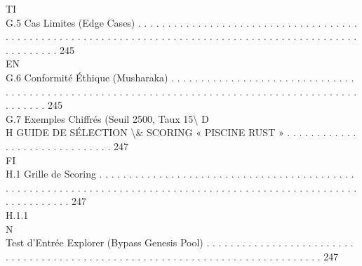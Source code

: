 \vspace{0.5em}
\vspace{0.5em}
\vspace{0.5em}
\vspace{0.5em}
TI\\
G.5     Cas Limites (Edge Cases) . . . . . . . . . . . . . . . . . . . . . . . . . . . . . . . . . . . . . . . . . . . . . . . . . . . . . . . . . . . . . . . . . . . . . . . . . . . . . . . . . . . . . . . . . . . . . . . . . . . . . . . . . 245\\
\vspace{0.5em}
\vspace{0.5em}
\vspace{0.5em}
\vspace{0.5em}
EN\\
G.6     Conformité Éthique (Musharaka) . . . . . . . . . . . . . . . . . . . . . . . . . . . . . . . . . . . . . . . . . . . . . . . . . . . . . . . . . . . . . . . . . . . . . . . . . . . . . . . . . . . . . . . . . . . . . . . . . 245\\
G.7     Exemples Chiffrés (Seuil 2500, Taux 15\textbackslash{}%
\vspace{0.5em}
\vspace{0.5em}
\vspace{0.5em}
\vspace{0.5em}
D\\
H     GUIDE DE SÉLECTION \textbackslash{}& SCORING « PISCINE RUST » . . . . . . . . . . . . . . . . . . . . . . . . . . . . . . 247\\
\vspace{0.5em}
\vspace{0.5em}
\vspace{0.5em}
FI\\
H.1     Grille de Scoring . . . . . . . . . . . . . . . . . . . . . . . . . . . . . . . . . . . . . . . . . . . . . . . . . . . . . . . . . . . . . . . . . . . . . . . . . . . . . . . . . . . . . . . . . . . . . . . . . . . . . . . . . . . . . . . . . 247\\
H.1.1\\
N\\
Test d’Entrée Explorer (Bypass Genesis Pool) . . . . . . . . . . . . . . . . . . . . . . . . . . . . . . . . . . . . . . . . . . . . . . . . . . . . . . . . . . . . . . . . . . . . . . . . . . . . . . 247\\
